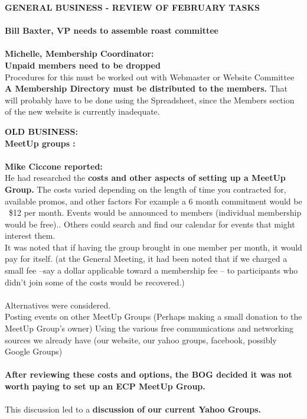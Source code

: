 \documentclass[10pt,a4paper]{article}
\begin{document}
\begin{multicols}{2}
\textbf{GENERAL BUSINESS - REVIEW OF FEBRUARY TASKS}
\\
\\
\textbf{Bill Baxter, VP needs to assemble roast committee}
\\
\\
\textbf{Michelle, Membership Coordinator:\\
   Unpaid members need to be dropped}\\
   	Procedures for this must be worked out with Webmaster or Website Committee\\
\textbf{   A Membership Directory must be distributed to the members.}  That will probably have to be done
   using the Spreadsheet, since the Members section of the new website is currently inadequate.
   

\textbf{OLD BUSINESS:}\\
\textbf{MeetUp groups :} \\ \\
\textbf{Mike Ciccone reported:} \\
   He had researched the \textbf{costs and other aspects of setting up a MeetUp Group.}
   The costs varied depending on the length of time you contracted for, available promos, and other factors
   For example a 6 month commitment would be ~\$12 per month.
   Events would be announced to members (individual membership would be free)..  Others could search and find our calendar for events that might interest them.\\
   It was noted that if having the group brought in one member per month, it would pay for itself.
   (at the General Meeting, it had been noted that if we charged a small fee --say a dollar applicable toward a membership fee -- to participants who didn't join some of the costs would be recovered.)
\\
\\
Alternatives were considered.\\
  Posting events on other MeetUp Groups (Perhaps making a small donation to the MeetUp Group's owner)
  Using the various free communications and networking sources we already have 
    (our website, our yahoo groups, facebook, possibly Google Groups)
\\
\\
\textbf{After reviewing these costs and options, the BOG decided it was not worth paying to set up an ECP MeetUp Group.}
\\
\\
This discussion led to a \textbf{discussion of our current Yahoo Groups.} \\

\end{multicols}
\end{document}
